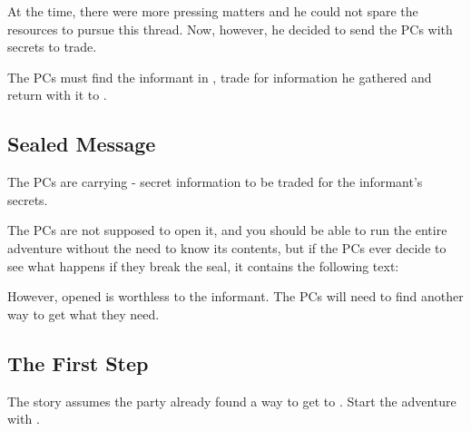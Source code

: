 At the time, there were more pressing matters and he could not spare the resources to pursue this thread. Now, however, he decided to send the PCs with secrets to trade.

The PCs must find the informant in \locationYeddaw{}, trade \lootSealedMessage{} for information he gathered and return with it to \locationUrithiru{}. 

\subsection{Sealed Message}

The PCs are carrying \lootSealedMessage{} - secret information to be traded for the informant’s secrets. 

The PCs are not supposed to open it, and you should be able to run the entire adventure without the need to know its contents, but if the PCs ever decide to see what happens if they break the seal, it contains the following text:


However, opened \lootSealedMessage{} is worthless to the informant. The PCs will need to find another way to get what they need.


\subsection{The First Step}

The story assumes the party already found a way to get to \locationYeddaw{}. Start the adventure with .





